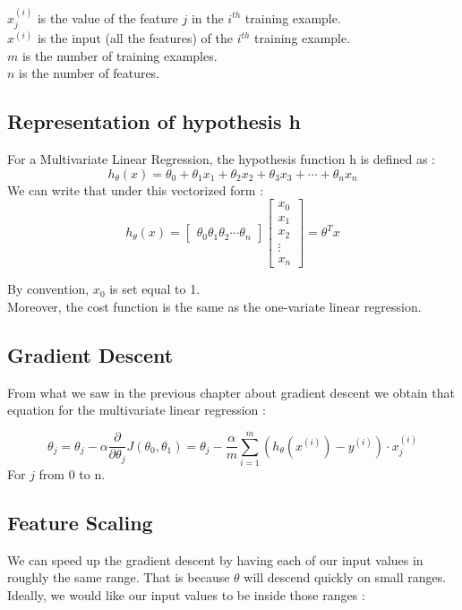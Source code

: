 \documentclass{article}
\begin{document}
$x^{(i)}_j$ is the value of the feature $j$ in the $i^{th}$ training example.\\
$x^{(i)}$ is the input (all the features) of the $i^{th}$ training example.\\
$m$ is the number of training examples.\\
$n$ is the number of features.

\subsection{Representation of hypothesis h}
For a Multivariate Linear Regression, the hypothesis function h is defined as : 
	$$h_\theta(x) = \theta_0 + \theta_1x_1 + \theta_2x_2 + \theta_3x_3 + \cdots + \theta_n x_n$$
We can write that under this vectorized form :
$$h_\theta(x) = {\begin{bmatrix}\theta_{0} \theta_{1} \theta_{2} \cdots \theta_{n}\end{bmatrix}
\begin{bmatrix}
	x_{0} \\
	x_{1} \\
	x_{2} \\
	\vdots \\
	x_{n}
\end{bmatrix}} = \theta^Tx$$

By convention, $x_{0}$ is set equal to 1.\\
Moreover, the cost function is the same as the one-variate linear regression.

\subsection{Gradient Descent}
From what we saw in the previous chapter about gradient descent we obtain that equation for the multivariate linear regression :

$$\theta_j =  \theta_j - \alpha \frac{\partial}{\partial\theta_j}J(\theta_0, \theta_1) = \theta_j - \frac{\alpha}{m}\sum_{i=1}^{m}(h_{\theta}(x^{(i)})-y^{(i)})\cdot x^{(i)}_{j}$$
For $j$ from 0 to n.

\subsection{Feature Scaling}

We can speed up the gradient descent by having each of our input values in roughly the same range. That is because $\theta$ will descend quickly on small ranges. Ideally, we would like our input values to be inside those ranges :\\
\end{document}
